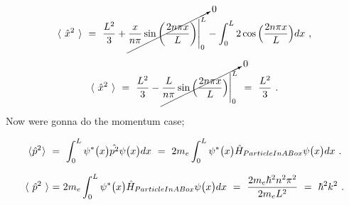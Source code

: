 \documentclass{article}
\begin{document}
\begin{equation} \label{eb-eq-255-4}
\langle \hspace{0.125cm} \hat{x}^{2} \hspace{0.125cm} \rangle \hspace{0.125cm} = \hspace{0.125cm} \frac{L^2}{3} + \cancelto{0}{\frac{x}{n \pi} \sin\bigg(\frac{2 n \pi x}{L}\bigg) \Bigg|_{0}^{L}} - \int_{0}^{L} 2 \cos\Big(\frac{2 n \pi x}{L}\Big) dx \hspace{0.125cm} ,
\end{equation}

\begin{equation} \label{eb-eq-255-5}
\langle \hspace{0.125cm} \hat{x}^{2} \hspace{0.125cm} \rangle \hspace{0.125cm} = \hspace{0.125cm} \frac{L^2}{3} - \cancelto{0}{\frac{L}{n \pi} \sin\Big(\frac{2 n \pi x}{L}\Big) \Bigg|_{0}^{L}} \hspace{0.125cm} = \hspace{0.125cm} \frac{L^2}{3} \hspace{0.125cm} .
\end{equation}

Now were gonna do the momentum case;

\begin{equation} \label{eb-eq-254-2}
\langle \hspace{0.0125cm} \hat{p}^{2} \hspace{0.0125cm} \rangle \hspace{0.125cm} = \hspace{0.125cm} \int_{0}^{L} \psi^{\ast}\big(x\big) \hat{p^{2}} \psi\big(x\big) dx \hspace{0.125cm} = \hspace{0.125cm} 2 m_e \int_{0}^{L} \psi^{\ast}\big(x\big) \hat{H}_{ParticleInABox} \psi\big(x\big) dx \hspace{0.125cm}  .
\end{equation}

\begin{equation} \label{eb-eq-254-3}
\langle \hspace{0.125cm} \hat{p}^{2} \hspace{0.125cm} \rangle \hspace{0.0125cm} = \hspace{0.0125cm} 2 m_e \int_{0}^{L} \psi^{\ast}\big(x\big) \hat{H}_{ParticleInABox} \psi\big(x\big) dx \hspace{0.125cm} = \hspace{0.125cm} \frac{2 m_e \hbar^{2} n^2 \pi^{2}}{2 m_e L^2} \hspace{0.125cm} = \hspace{0.125cm} \hbar^{2} k^2 \hspace{0.125cm}  .
\end{equation}
\end{document}
